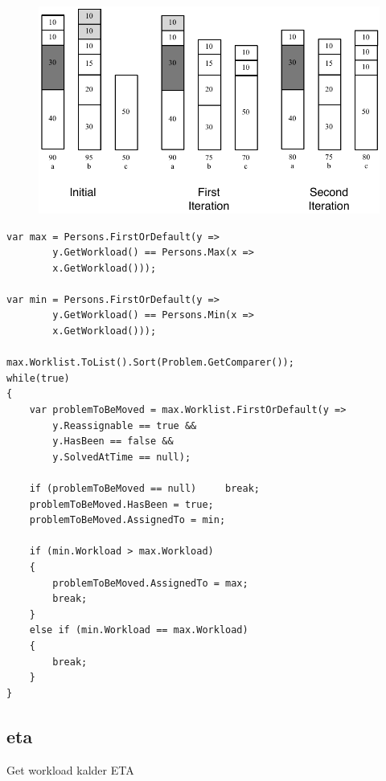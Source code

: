 \begin{figure}
	\centering
		\includegraphics[scale=0.8]{input/implementation/key_points/balanceWorkloadDiagram.pdf}
	\label{fig:balanceWorkloadDiagram}
\end{figure}


\begin{lstlisting}[style=sourceCode, caption=\myCaption{To be}, label=lst:balanceWorkload]
var max = Persons.FirstOrDefault(y => 	
		y.GetWorkload() == Persons.Max(x => 
		x.GetWorkload()));                  

var min = Persons.FirstOrDefault(y => 
		y.GetWorkload() == Persons.Min(x => 
		x.GetWorkload()));
    
max.Worklist.ToList().Sort(Problem.GetComparer());             
while(true)
{
    var problemToBeMoved = max.Worklist.FirstOrDefault(y => 
		y.Reassignable == true && 
		y.HasBeen == false && 
		y.SolvedAtTime == null);
                   
    if (problemToBeMoved == null)     break; 
    problemToBeMoved.HasBeen = true;
    problemToBeMoved.AssignedTo = min;
    
    if (min.Workload > max.Workload)
    {
    	problemToBeMoved.AssignedTo = max;
    	break;
    }
    else if (min.Workload == max.Workload)
    {
		break;
    }
} 
\end{lstlisting}




\subsection{eta}
\label{}


Get workload kalder ETA